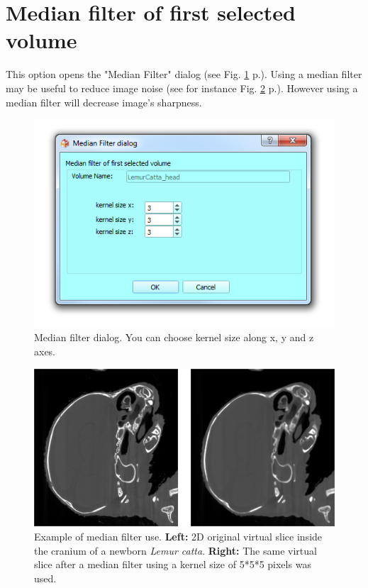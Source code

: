 \section{Median filter of first selected volume}


This option opens the "Median Filter" dialog (see Fig. \ref{median_dialog} p.\pageref{median_dialog}). Using a median filter may be useful to reduce image noise (see for instance Fig. \ref{median_example} p.\pageref{median_example}). However using a median filter will decrease image's sharpness.
 
\begin{figure}
  \centering
  \includegraphics[scale=0.5]{images/14/median/median_dialog.png}
\caption{Median filter dialog. You can choose kernel size along x, y and z axes.}	
\label{median_dialog}
 \end{figure}


\begin{figure}
  \centering
  \includegraphics[scale=0.35]{images/14/median/median_example_5_5_5.png}
\caption{ Example of median filter use. \textbf{Left:} 2D original virtual slice inside the cranium of a newborn \textit{Lemur catta}. \textbf{Right:} The same virtual slice after a median filter using a kernel size of 5*5*5 pixels was used.}	
\label{median_example}
 \end{figure}


